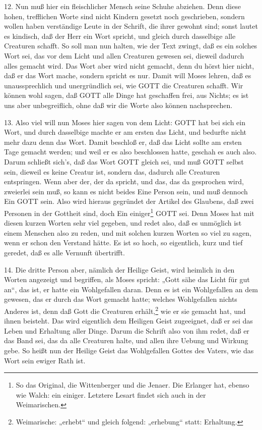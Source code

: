 12. Nun muß hier ein fleischlicher Mensch seine Schuhe abziehen. Denn diese hohen, trefflichen Worte sind nicht Kindern gesetzt noch geschrieben, sondern wollen haben verständige Leute in der Schrift, die ihrer gewohnt sind; sonst lautet es kindisch, daß der Herr ein Wort spricht, und gleich durch dasselbige alle Creaturen schafft. So soll man nun halten, wie der Text zwingt, daß es ein solches Wort sei, das vor dem Licht und allen Creaturen gewesen sei, dieweil dadurch alles gemacht wird. Das Wort aber wird nicht gemacht, denn du hörst hier nicht, daß er das Wort mache, sondern spricht es nur. Damit will Moses lehren, daß es unaussprechlich und unergründlich sei, wie GOTT die Creaturen schafft. Wir können wohl sagen, daß GOTT alle Dinge hat geschaffen frei, aus Nichts; es ist uns aber unbegreiflich, ohne daß wir die Worte also können nachsprechen.

13. Also viel will nun Moses hier sagen von dem Licht: GOTT hat bei sich ein Wort, und durch dasselbige machte er am ersten das Licht, und bedurfte nicht mehr dazu denn das Wort. Damit beschloß er, daß das Licht sollte am ersten Tage gemacht werden; und weil er es also beschlossen hatte, geschah es auch also. Darum schließt sich’s, daß das Wort GOTT gleich sei, und muß GOTT selbst sein, dieweil es keine Creatur ist, sondern das, dadurch alle Creaturen entspringen. Wenn aber der, der da spricht, und das, das da gesprochen wird, zweierlei sein muß, so kann es nicht beides Eine Person sein, und muß dennoch Ein GOTT sein. Also wird hieraus gegründet der Artikel des Glaubens, daß zwei Personen in der Gottheit sind, doch Ein einiger\footnote{So das Original, die Wittenberger und die Jenaer. Die Erlanger hat, ebenso wie Walch: ein einiger. Letztere Lesart findet sich auch in der Weimarischen.} GOTT sei. Denn Moses hat mit
diesen kurzen Worten sehr viel gegeben, und redet also, daß es unmöglich ist einem Menschen also zu reden, und mit solchen kurzen Worten so viel zu sagen, wenn er schon den Verstand hätte. Es ist so hoch, so eigentlich, kurz und tief geredet, daß es alle Vernunft übertrifft.

14. Die dritte Person aber, nämlich der Heilige Geist, wird heimlich in den Worten angezeigt und begriffen, als Moses spricht: „Gott sähe das Licht für gut an“, das ist, er hatte ein Wohlgefallen daran. Denn es ist ein Wohlgefallen an dem gewesen, das er durch das Wort gemacht hatte; welches Wohlgefallen nichts Anderes ist, denn daß Gott die Creaturen erhält,\footnote{Weimarische: „erhebt“ und gleich folgend: „erhebung“ statt: Erhaltung.} wie er sie gemacht hat, und ihnen beisteht. Das wird eigentlich dem Heiligen Geist zugeeignet, daß er sei das Leben und Erhaltung aller Dinge. Darum die Schrift also von ihm redet, daß er das Band sei, das da alle Creaturen halte, und allen ihre Uebung und Wirkung gebe. So heißt nun der Heilige Geist das Wohlgefallen Gottes des Vaters, wie das Wort sein ewiger Rath ist.

